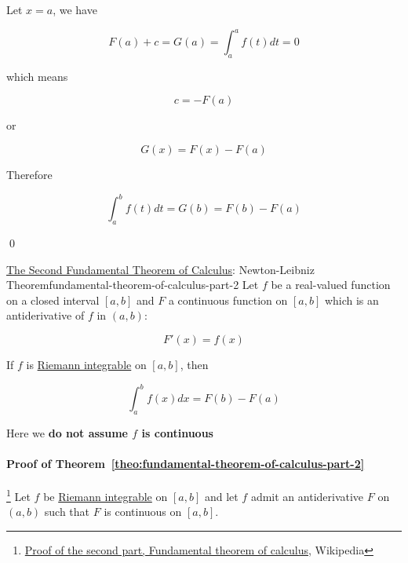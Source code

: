 Let $x = a$, we have

\begin{equation}
    F(a) + c = G(a) = \int_a^a f(t)dt = 0
\end{equation}

which means

\begin{equation}
    c = - F(a)
\end{equation}

or

\begin{equation}
    G(x) = F(x) - F(a)
\end{equation}

Therefore

\begin{equation}
    \int_a^b f(t) dt = G(b) = F(b) - F(a)
\end{equation}

\qed

\begin{Theorem}{\href{https://en.wikipedia.org/wiki/Fundamental\_theorem\_of\_calculus\#Second\_part}{The Second Fundamental Theorem of Calculus}: Newton-Leibniz Theorem}{fundamental-theorem-of-calculus-part-2}
    Let $f$ be a real-valued function on a closed interval $[a, b]$ and $F$ a continuous function on $[a, b]$ which is
    an antiderivative of $f$ in $(a, b)$:

    \begin{equation}
        F'(x) = f(x)
    \end{equation}

    If $f$ is \hyperref[eq:riemann-integral]{Riemann integrable} on $[a, b]$, then

    \begin{equation}
        \int_a^b f(x)dx = F(b) - F(a)
    \end{equation}

    Here we \textbf{do not assume $f$ is continuous}
\end{Theorem}

\paragraph{Proof of Theorem~\ref{theo:fundamental-theorem-of-calculus-part-2}}

\footnote{\href{https://en.wikipedia.org/wiki/Fundamental\_theorem\_of\_calculus\#Proof\_of\_the\_second\_part}{Proof of the second part, Fundamental theorem of calculus}, Wikipedia}
Let $f$ be \hyperref[eq:riemann-integral]{Riemann integrable} on $[a, b]$ and let $f$ admit an antiderivative $F$ on
$(a, b)$ such that $F$ is continuous on $[a, b]$.

